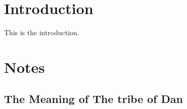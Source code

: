 \documentclass{book}
\begin{document}
\tableofcontents %

\chapter{Introduction}
This is the introduction.






\printindex

\appendix

\chapter{Notes }


\section{The Meaning of The tribe of Dan}
\end{document}
